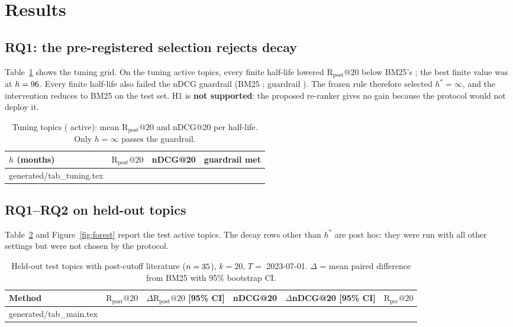 \documentclass[acmsmall]{acmart}
\makeatletter
\newcommand{\Rpost}{\mathrm{R}_{\text{post}}@20}
\makeatother
\begin{document}
\section{Results}\label{sec:results}

\subsection{RQ1: the pre-registered selection rejects decay}
Table~\ref{tab:tuning} shows the tuning grid. On the \NTuneAct{} tuning active topics, every finite half-life lowered $\Rpost$ below BM25's \TuneBMRpost; the best finite value was \TuneBestFiniteRpost{} at $h=96$. Every finite half-life also failed the nDCG guardrail (BM25 \TuneBMnDCG; guardrail \TuneGuard). The frozen rule therefore selected $h^{*}=\infty$, and the intervention reduces to BM25 on the test set. H1 is \textbf{not supported}: the proposed re-ranker gives no gain because the protocol would not deploy it.

\begin{table}[t]
\caption{Tuning topics (\NTuneAct{} active): mean $\Rpost$ and nDCG@20 per half-life. Only $h=\infty$ passes the guardrail.}\label{tab:tuning}
\small
\begin{tabular}{@{}lccc@{}}
\toprule
$h$ (months) & $\Rpost$ & nDCG@20 & guardrail met \\
\midrule
{} generated/tab_tuning.tex 
\bottomrule
\end{tabular}
\end{table}

\subsection{RQ1--RQ2 on held-out topics}
Table~\ref{tab:main} and Figure~\ref{fig:forest} report the \NTestAct{} test active topics. The decay rows other than $h^{*}$ are post hoc: they were run with all other settings but were not chosen by the protocol.

\begin{table}[t]
\caption{Held-out test topics with post-cutoff literature ($n=35$), $k=20$, $T=$ 2023-07-01. $\Delta$ = mean paired difference from BM25 with 95\% bootstrap CI.}\label{tab:main}
\footnotesize\setlength{\tabcolsep}{2pt}
\begin{tabular}{@{}lccccc@{}}
\toprule
Method & $\Rpost$ & $\Delta\Rpost$ [95\% CI] & nDCG@20 & $\Delta$nDCG@20 [95\% CI] & $\mathrm{R}_{\text{pre}}@20$ \\
\midrule
{} generated/tab_main.tex 
\bottomrule
\end{tabular}
\end{table}
\end{document}
